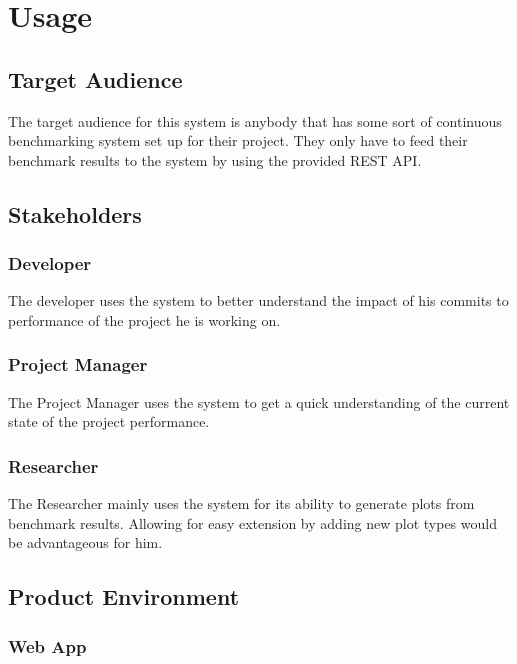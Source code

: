 \section{Usage}

\subsection{Target Audience}

The target audience for this system is anybody that has some sort of continuous benchmarking system set up for their project. They only have to feed their benchmark results to the system by using the provided \gls{REST API}.

\subsection{Stakeholders}

\subsubsection*{Developer}

The developer uses the system to better understand the impact of his commits to performance of the project he is working on.

\subsubsection*{Project Manager}

The Project Manager uses the system to get a quick understanding of the current state of the project performance.

\subsubsection*{Researcher}

The Researcher mainly uses the system for its ability to generate \glspl{plot} from benchmark results. Allowing for easy extension by adding new \gls{plot} types would be advantageous for him.


\subsection{Product Environment}

\subsubsection{Web App}

